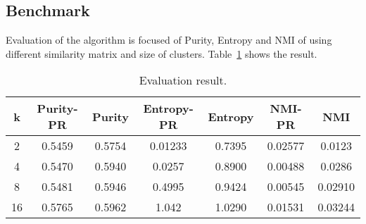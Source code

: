 \documentclass{article}
\begin{document}
\subsection{Benchmark}
Evaluation of the algorithm is focused of Purity, Entropy and NMI
of using different similarity matrix and size of clusters.
Table~\ref{result} shows the result.

\begin{table}[tbh]
  \center
  \footnotesize
  \begin{tabular}{c|c|c|c|c|c|c}
    \textbf{k} & \textbf{Purity-PR} & \textbf{Purity} & \textbf{Entropy-PR} & \textbf{Entropy} & \textbf{NMI-PR} & \textbf{NMI} \\
    \hline
    2 & 0.5459 & 0.5754 & 0.01233 & 0.7395 & 0.02577 & 0.0123 \\
    \hline
    4 & 0.5470 & 0.5940 & 0.0257 & 0.8900 & 0.00488 & 0.0286 \\
    \hline
    8 & 0.5481 & 0.5946 & 0.4995 & 0.9424 & 0.00545 & 0.02910 \\
    \hline
    16 & 0.5765 & 0.5962 & 1.042 & 1.0290 & 0.01531 & 0.03244 \\
  \end{tabular}
  \caption{Evaluation result.}
  \label{result}
\end{table}
\end{document}
